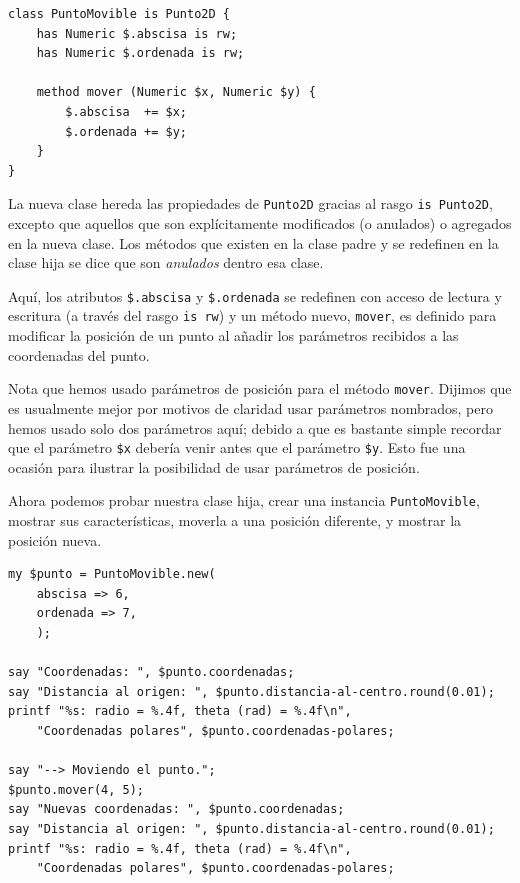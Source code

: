 \begin{verbatim}
class PuntoMovible is Punto2D {
    has Numeric $.abscisa is rw;
    has Numeric $.ordenada is rw;
    
    method mover (Numeric $x, Numeric $y) {
        $.abscisa  += $x;
        $.ordenada += $y;
    }
}
\end{verbatim}

La nueva clase hereda las propiedades de {\tt Punto2D} 
gracias al rasgo {\tt is Punto2D}, excepto que aquellos
que son explícitamente modificados (o anulados) o agregados
en la nueva clase. Los métodos que existen en la clase padre
y se redefinen en la clase hija se dice que son \emph{anulados}
dentro esa clase.

Aquí, los atributos \verb|$.abscisa| y \verb|$.ordenada| 
se redefinen con acceso de lectura y escritura (a través del rasgo
{\tt is rw}) y un método nuevo, {\tt mover}, es definido para modificar
la posición de un punto al añadir los parámetros recibidos a las
coordenadas del punto.

Nota que hemos usado parámetros de posición para el método {\tt mover}. 
Dijimos que es usualmente mejor por motivos de claridad usar parámetros
nombrados, pero hemos usado solo dos parámetros aquí; debido a que 
es bastante simple recordar que el parámetro \verb|$x| debería venir
antes que el parámetro \verb|$y|. Esto fue una ocasión para ilustrar la
posibilidad de usar parámetros de posición.

Ahora podemos probar nuestra clase hija, crear una instancia 
{\tt PuntoMovible}, mostrar sus características, moverla a una
posición diferente, y mostrar la posición nueva. 

\begin{verbatim}
my $punto = PuntoMovible.new(
    abscisa => 6,
    ordenada => 7,
    );

say "Coordenadas: ", $punto.coordenadas;
say "Distancia al origen: ", $punto.distancia-al-centro.round(0.01);
printf "%s: radio = %.4f, theta (rad) = %.4f\n", 
    "Coordenadas polares", $punto.coordenadas-polares;

say "--> Moviendo el punto.";
$punto.mover(4, 5);
say "Nuevas coordenadas: ", $punto.coordenadas;
say "Distancia al origen: ", $punto.distancia-al-centro.round(0.01);
printf "%s: radio = %.4f, theta (rad) = %.4f\n", 
    "Coordenadas polares", $punto.coordenadas-polares;
\end{verbatim}

